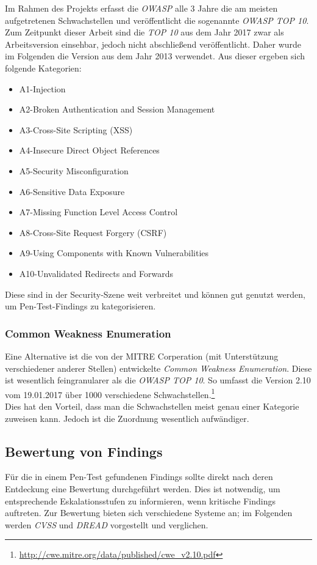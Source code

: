 		Im Rahmen des Projekts erfasst die \textit{OWASP} alle 3 Jahre die am meisten aufgetretenen Schwachstellen und veröffentlicht die sogenannte \textit{OWASP TOP 10}. Zum Zeitpunkt dieser Arbeit sind die \textit{TOP 10} aus dem Jahr 2017 zwar als Arbeitsversion einsehbar, jedoch nicht abschließend veröffentlicht. Daher wurde im Folgenden die Version aus dem Jahr 2013 verwendet. Aus dieser ergeben sich folgende Kategorien\cite{OWASPTOP10}:
		\begin{itemize}
			\item A1-Injection
			\item A2-Broken Authentication and Session Management
			\item A3-Cross-Site Scripting (XSS)
			\item A4-Insecure Direct Object References
			\item A5-Security Misconfiguration
			\item A6-Sensitive Data Exposure
			\item A7-Missing Function Level Access Control
			\item A8-Cross-Site Request Forgery (CSRF)
			\item A9-Using Components with Known Vulnerabilities 
			\item A10-Unvalidated Redirects and Forwards
		\end{itemize}
		
		Diese sind in der Security-Szene weit verbreitet und können gut genutzt werden, um Pen-Test-Findings zu kategorisieren.
		
		\subsubsection{Common Weakness Enumeration}
		Eine Alternative ist die von der MITRE Corperation (mit Unterstützung verschiedener anderer Stellen) entwickelte \textit{Common Weakness Enumeration}. Diese ist wesentlich feingranularer als die \textit{OWASP TOP 10}. So umfasst die Version 2.10 vom 19.01.2017 über 1000 verschiedene Schwachstellen.\footnote{\url{http://cwe.mitre.org/data/published/cwe_v2.10.pdf}}\cite{MITRECWE}\\
		
		Dies hat den Vorteil, dass man die Schwachstellen meist genau einer Kategorie zuweisen kann. Jedoch ist die Zuordnung wesentlich aufwändiger.
			
	\subsection{Bewertung von Findings}
	Für die in einem Pen-Test gefundenen Findings sollte direkt nach deren Entdeckung eine Bewertung durchgeführt werden. Dies ist notwendig, um entsprechende Eskalationsstufen zu informieren, wenn kritische Findings auftreten. Zur Bewertung bieten sich verschiedene Systeme an; im Folgenden werden \textit{CVSS} und \textit{DREAD} vorgestellt und verglichen.
	
